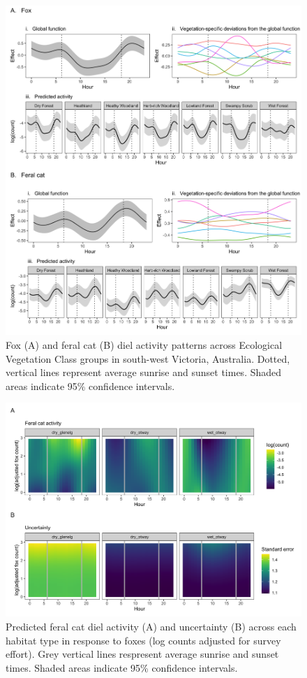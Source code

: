\documentclass[]{elsarticle} %
\begin{document}
\begin{figure}
\includegraphics[width=1\linewidth]{../figs/predator_veg} \caption{Fox (A) and feral cat (B) diel activity patterns across Ecological Vegetation Class groups in south-west Victoria, Australia. Dotted, vertical lines represent average sunrise and sunset times. Shaded areas indicate 95\% confidence intervals.}\label{fig:veg}
\end{figure}

\newpage

\begin{figure}
\includegraphics[width=1\linewidth]{../figs/cat_fox_count} \caption{Predicted feral cat diel activity (A) and uncertainty (B) across each habitat type in response to foxes (log counts adjusted for survey effort). Grey vertical lines respresent average sunrise and sunset times. Shaded areas indicate 95\% confidence intervals.}\label{fig:count}
\end{figure}
\end{document}
